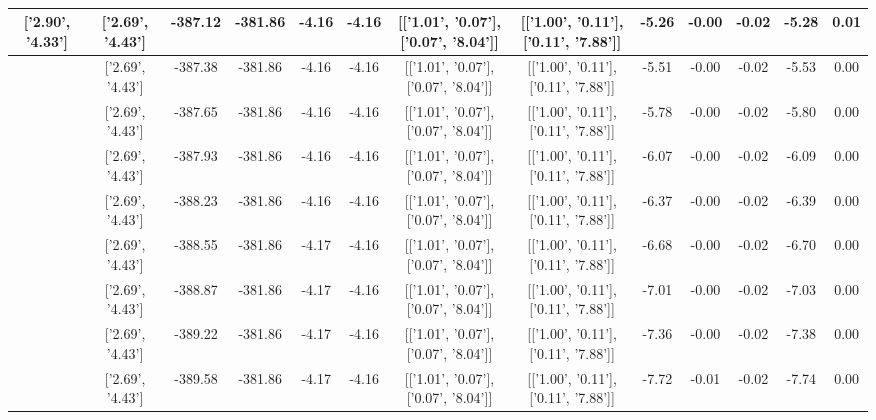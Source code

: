 \begin{table}[htbp]
\begin{adjustbox}{angle=90}
\begin{tabular}{|c|c|c|c|c|c|c|c|c|c|c|c|c|}
 ['2.90', '4.33'] & ['2.69', '4.43'] & -387.12 & -381.86 & -4.16 & -4.16 & [['1.01', '0.07'], ['0.07', '8.04']] & [['1.00', '0.11'], ['0.11', '7.88']] & -5.26 & -0.00 & -0.02 & -5.28 & 0.01\\ \hline
 ['2.91', '4.32'] & ['2.69', '4.43'] & -387.38 & -381.86 & -4.16 & -4.16 & [['1.01', '0.07'], ['0.07', '8.04']] & [['1.00', '0.11'], ['0.11', '7.88']] & -5.51 & -0.00 & -0.02 & -5.53 & 0.00\\ \hline
 ['2.93', '4.32'] & ['2.69', '4.43'] & -387.65 & -381.86 & -4.16 & -4.16 & [['1.01', '0.07'], ['0.07', '8.04']] & [['1.00', '0.11'], ['0.11', '7.88']] & -5.78 & -0.00 & -0.02 & -5.80 & 0.00\\ \hline
 ['2.94', '4.31'] & ['2.69', '4.43'] & -387.93 & -381.86 & -4.16 & -4.16 & [['1.01', '0.07'], ['0.07', '8.04']] & [['1.00', '0.11'], ['0.11', '7.88']] & -6.07 & -0.00 & -0.02 & -6.09 & 0.00\\ \hline
 ['2.95', '4.30'] & ['2.69', '4.43'] & -388.23 & -381.86 & -4.16 & -4.16 & [['1.01', '0.07'], ['0.07', '8.04']] & [['1.00', '0.11'], ['0.11', '7.88']] & -6.37 & -0.00 & -0.02 & -6.39 & 0.00\\ \hline
 ['2.96', '4.30'] & ['2.69', '4.43'] & -388.55 & -381.86 & -4.17 & -4.16 & [['1.01', '0.07'], ['0.07', '8.04']] & [['1.00', '0.11'], ['0.11', '7.88']] & -6.68 & -0.00 & -0.02 & -6.70 & 0.00\\ \hline
 ['2.98', '4.29'] & ['2.69', '4.43'] & -388.87 & -381.86 & -4.17 & -4.16 & [['1.01', '0.07'], ['0.07', '8.04']] & [['1.00', '0.11'], ['0.11', '7.88']] & -7.01 & -0.00 & -0.02 & -7.03 & 0.00\\ \hline
 ['2.99', '4.29'] & ['2.69', '4.43'] & -389.22 & -381.86 & -4.17 & -4.16 & [['1.01', '0.07'], ['0.07', '8.04']] & [['1.00', '0.11'], ['0.11', '7.88']] & -7.36 & -0.00 & -0.02 & -7.38 & 0.00\\ \hline
 ['3.00', '4.28'] & ['2.69', '4.43'] & -389.58 & -381.86 & -4.17 & -4.16 & [['1.01', '0.07'], ['0.07', '8.04']] & [['1.00', '0.11'], ['0.11', '7.88']] & -7.72 & -0.01 & -0.02 & -7.74 & 0.00\\ \hline
            \end{tabular}
        \end{adjustbox}
        \caption{}
        \label{}
    \end{table}
    